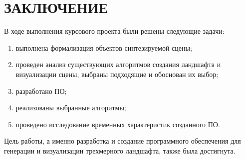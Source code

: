 \chapter*{ЗАКЛЮЧЕНИЕ}

В ходе выполнения курсового проекта были решены следующие задачи: 

\begin{enumerate}[label={\arabic*)}]
	\item выполнена формализация объектов синтезируемой сцены;
	\item проведен анализ существующих алгоритмов создания ландшафта и визуализации сцены, выбраны подходящие и обоснован их выбор;
	\item разработано ПО;
	\item реализованы выбранные алгоритмы;
	\item проведено исследование временных характеристик созданного ПО.
\end{enumerate}

Цель работы, а именно разработка и создание программного обеспечения для генерации и визуализации трехмерного ландшафта, также была достигнута.
